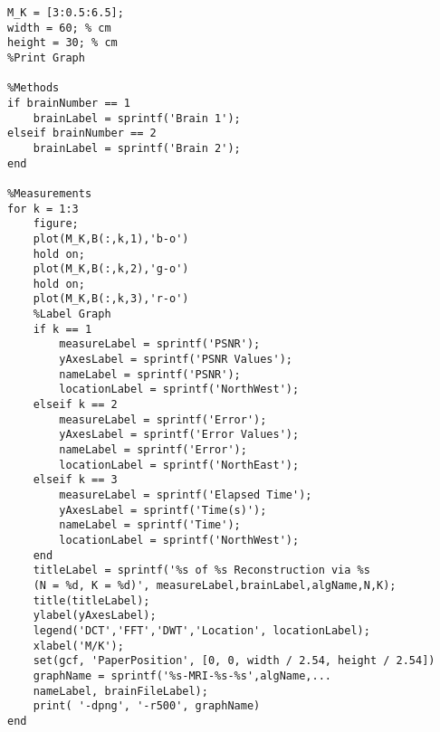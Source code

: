 \documentclass[titlepage,oneside, 12pt]{book}
\theoremstyle{break}
\begin{document}
\begin{appendices}
\begin{lstlisting}
M_K = [3:0.5:6.5];
width = 60; % cm 
height = 30; % cm
%Print Graph
        
%Methods
if brainNumber == 1
    brainLabel = sprintf('Brain 1');
elseif brainNumber == 2 
    brainLabel = sprintf('Brain 2');
end

%Measurements
for k = 1:3
    figure;
    plot(M_K,B(:,k,1),'b-o')
    hold on;
    plot(M_K,B(:,k,2),'g-o')
    hold on;
    plot(M_K,B(:,k,3),'r-o')
    %Label Graph
    if k == 1
        measureLabel = sprintf('PSNR');
        yAxesLabel = sprintf('PSNR Values');
        nameLabel = sprintf('PSNR');
        locationLabel = sprintf('NorthWest');
    elseif k == 2
        measureLabel = sprintf('Error');
        yAxesLabel = sprintf('Error Values');
        nameLabel = sprintf('Error');
        locationLabel = sprintf('NorthEast');
    elseif k == 3
        measureLabel = sprintf('Elapsed Time');
        yAxesLabel = sprintf('Time(s)');
        nameLabel = sprintf('Time');
        locationLabel = sprintf('NorthWest');
    end
    titleLabel = sprintf('%s of %s Reconstruction via %s 
    (N = %d, K = %d)', measureLabel,brainLabel,algName,N,K);
    title(titleLabel);
    ylabel(yAxesLabel);
    legend('DCT','FFT','DWT','Location', locationLabel);
    xlabel('M/K');
    set(gcf, 'PaperPosition', [0, 0, width / 2.54, height / 2.54])
    graphName = sprintf('%s-MRI-%s-%s',algName,...
    nameLabel, brainFileLabel);
    print( '-dpng', '-r500', graphName)
end
    
 
\end{lstlisting}

\end{appendices}




\end{document}
